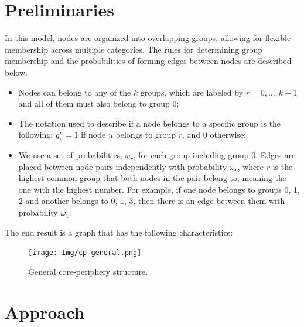 \documentclass[sigconf]{acmart}
\begin{document}
\section{Preliminaries}

In this model, nodes are organized into overlapping groups, allowing for flexible membership across multiple categories. The rules for determining group membership and the probabilities of forming edges between nodes are described below. \\
\begin{itemize}
    \item Nodes can belong to any of the $k$ groups, which are labeled by $r = 0, ..., k - 1$ and all of them must also belong to group 0;
    \item The notation used to describe if a node belongs to a specific group is the following: $g_u^r = 1$ if node $u$ belongs to group $r$, and $0$ otherwise;
    \item We use a set of probabilities, $\omega_r$, for each group including group 0. Edges are placed between node pairs independently with probability $\omega_r$, where $r$ is the highest common group that both nodes in the pair belong to, meaning the one with the highest number. For example, if one node belongs to groups 0, 1, 2 and another belongs to 0, 1, 3, then there is an edge between them with probability $\omega_1$.
\end{itemize}
\vspace{0.3cm}
The end result is a graph that has the following characteristics:
\FloatBarrier
\begin{figure}[h]
    \centering
    \texttt{[image: Img/cp general.png]}
    \caption{General core-periphery structure.}
    \label{fig:general cp}
\end{figure}
\FloatBarrier
{}


\section{Approach}
\end{document}
